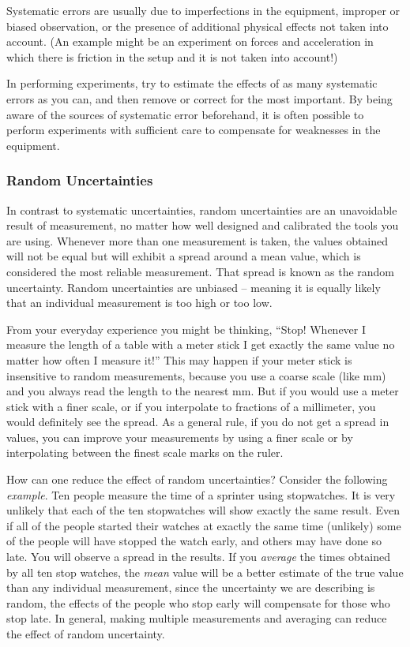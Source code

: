 Systematic errors are usually due to imperfections in the equipment, improper or biased observation, or the presence of additional physical effects not taken into account. (An example might be an experiment on forces and acceleration in which there is friction in the setup and it is not taken into account!) \myskip

In performing experiments, try to estimate the effects of as many systematic errors as you can, and then remove or correct for the most important. By being aware of the sources of systematic error beforehand, it is often possible to perform experiments with sufficient care to compensate for weaknesses in the equipment.

\subsubsection{Random Uncertainties}

In contrast to systematic uncertainties, random uncertainties are an unavoidable result of measurement, no matter how well designed and calibrated the tools you are using. Whenever more than one measurement is taken, the values obtained will not be equal but will exhibit a spread around a mean value, which is considered the most reliable measurement. That spread is known as the random uncertainty. Random uncertainties are unbiased -- meaning it is equally likely that an individual measurement is too high or too low. \myskip

From your everyday experience you might be thinking, ``Stop! Whenever I measure the length of a table with a meter stick I get exactly the same value no matter how often I measure it!''   This may happen if your meter stick is insensitive to random measurements, because you use a coarse scale (like $\mathrm{mm}$) and you always read the length to the nearest $\mathrm{mm}$. But if you would use a meter stick with a finer scale, or if you interpolate to fractions of a millimeter, you would definitely see the spread. As a general rule, if you do not get a spread in values, you can improve your measurements by using a finer scale or by interpolating between the finest scale marks on the ruler. \myskip

How can one reduce the effect of random uncertainties?  Consider the following \emph{example}. Ten people measure the time of a sprinter using stopwatches. It is very unlikely that each of the ten stopwatches will show exactly the same result. Even if all of the people started their watches at exactly the same time (unlikely) some of the people will have stopped the watch early, and others may have done so late. You will observe a spread in the results. If you \emph{average} the times obtained by all ten stop watches, the \emph{mean} value will be a better estimate of the true value than any individual measurement, since the uncertainty we are describing is random, the effects of the people who stop early will compensate for those who stop late. In general, making multiple measurements and averaging can reduce the effect of random uncertainty. \myskip

